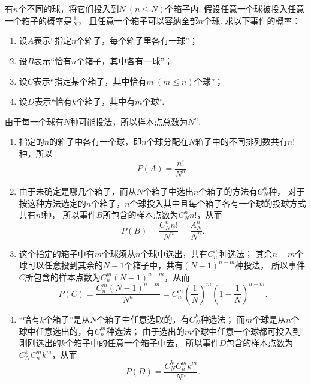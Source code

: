 \begin{example}[投球问题]\label{example:概率论基础.古典概型.投球问题}
有\(n\)个不同的球，将它们投入到\(N\ (n \leq N)\)个箱子内.
假设任意一个球被投入任意一个箱子的概率是\(\frac{1}{N}\)，
且任意一个箱子可以容纳全部\(n\)个球.
求以下事件的概率：
\begin{enumerate}
	\item 设\(A\)表示“指定\(n\)个箱子，每个箱子里各有一球”；
	\item 设\(B\)表示“恰有\(n\)个箱子，其中各有一球”；
	\item 设\(C\)表示“指定某个箱子，其中恰有\(m\ (m \leq n)\)个球”；
	\item 设\(D\)表示“恰有\(k\)个箱子，其中有\(m\)个球”.
\end{enumerate}
\begin{solution}
由于每一个球有\(N\)种可能投法，所以样本点总数为\(N^n\).
\begin{enumerate}
	\item
	指定的\(n\)的箱子中各有一个球，即\(n\)个球分配在\(N\)箱子中的不同排列数共有\(n!\)种，所以\[
		P(A) = \frac{n!}{N^n}.
	\]

	\item
	由于未确定是哪几个箱子，而从\(N\)个箱子中选出\(n\)个箱子的方法有\(C_N^n\)种，
	对于按这种方法选定的\(n\)个箱子，\(n\)个球投入其中且每个箱子各有一个球的投球方式共有\(n!\)种，
	所以事件\(B\)所包含的样本点数为\(C_N^n n!\)，从而\[
		P(B) = \frac{C_N^n n!}{N^n} = \frac{A_N^n}{N^n}.
	\]

	\item
	这个指定的箱子中有\(m\)个球须从\(n\)个球中选出，共有\(C_n^m\)种选法；
	其余\(n-m\)个球可以任意投到其余的\(N-1\)个箱子中，共有\((N-1)^{n-m}\)种投法，
	所以事件\(C\)所包含的样本点数为\(C_n^m (N-1)^{n-m}\)，从而\[
		P(C) = \frac{C_n^m (N-1)^{n-m}}{N^n}
		= C_n^m \left(\frac{1}{N}\right)^m \left(1-\frac{1}{N}\right)^{n-m}.
	\]

	\item
	“恰有\(k\)个箱子”是从\(N\)个箱子中任意选取的，有\(C_N^k\)种选法；
	而\(m\)个球是从\(n\)个球中任意选出的，有\(C_n^m\)种选法；
	由于选出的\(m\)个球中任意一个球都可投入到刚刚选出的\(k\)个箱子中的任意一个箱子中去，
	所以事件\(D\)包含的样本点数为\(C_N^k C_n^m k^m\)，从而\[
		P(D) = \frac{C_N^k C_n^m k^m}{N^n}.
	\]
\end{enumerate}
\end{solution}
\end{example}

